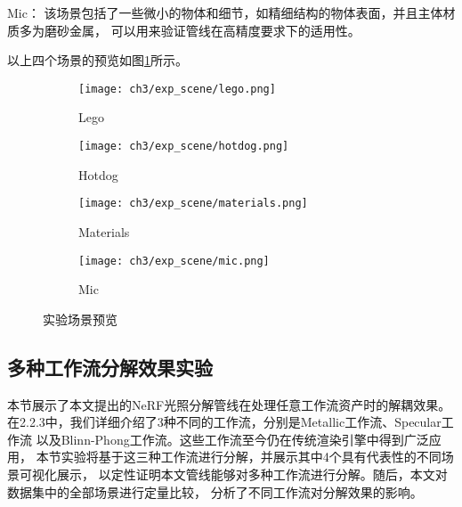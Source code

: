  Mic：
该场景包括了一些微小的物体和细节，如精细结构的物体表面，并且主体材质多为磨砂金属，
可以用来验证管线在高精度要求下的适用性。

以上四个场景的预览如图\ref{fig:exp_scene}所示。

\begin{figure}[H]
  \centering
  \begin{subfigure}[t]{0.24\textwidth}
    \centering
    \texttt{[image: ch3/exp\_scene/lego.png]}
    \caption{Lego}
  \end{subfigure}
  \begin{subfigure}[t]{0.24\textwidth}
    \centering
    \texttt{[image: ch3/exp\_scene/hotdog.png]}
    \caption{Hotdog}
  \end{subfigure}
  \begin{subfigure}[t]{0.24\textwidth}
    \centering
    \texttt{[image: ch3/exp\_scene/materials.png]}
    \caption{Materials}
  \end{subfigure}
  \begin{subfigure}[t]{0.24\textwidth}
    \centering
    \texttt{[image: ch3/exp\_scene/mic.png]}
    \caption{Mic}
  \end{subfigure}
  \caption{实验场景预览}
  \label{fig:exp_scene}
\end{figure}

\subsection{多种工作流分解效果实验}
本节展示了本文提出的NeRF光照分解管线在处理任意工作流资产时的解耦效果。
在2.2.3中，我们详细介绍了3种不同的工作流，分别是Metallic工作流、Specular工作流
以及Blinn-Phong工作流。这些工作流至今仍在传统渲染引擎中得到广泛应用，
本节实验将基于这三种工作流进行分解，并展示其中4个具有代表性的不同场景可视化展示，
以定性证明本文管线能够对多种工作流进行分解。随后，本文对数据集中的全部场景进行定量比较，
分析了不同工作流对分解效果的影响。

